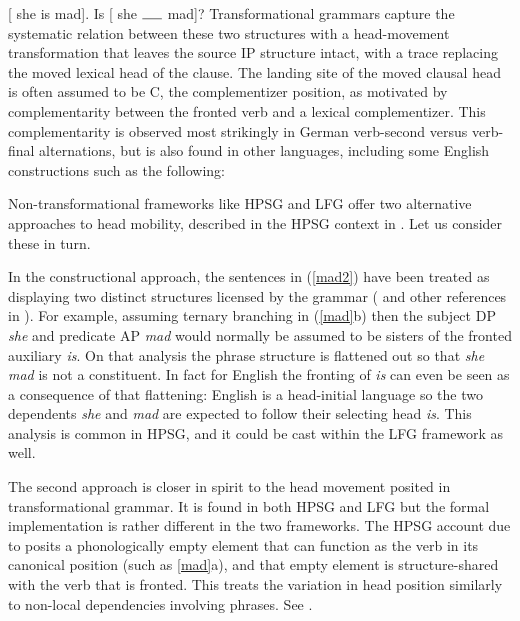 \eal 
\label{mad}
\ex {} [ she is mad].
\ex  Is   [ she $\rule{0.5cm}{0.15mm}$ mad]?
\zl
Transformational grammars capture the systematic relation between these two structures with a head-movement transformation that leaves the source IP structure intact, with a trace replacing the moved lexical head of the clause.  The landing site of the moved clausal head is often assumed to be C, the complementizer position, as motivated by complementarity between the fronted verb and a lexical complementizer.  This complementarity is observed most strikingly in German verb-second versus verb-final alternations, but is also found in other languages, including some English constructions such as the following:  

\eal 
\label{mad2}
      \zl Non-transformational frameworks like HPSG and LFG offer two alternative approaches to head mobility, described in the HPSG context in .  Let us consider these in turn.

In the constructional approach,  
 the sentences in (\ref{mad2}) have been treated as displaying two distinct structures licensed by the grammar (\citealt{Sag2020a} and other references in ).  For example, assuming ternary branching in (\ref{mad}b) then the subject DP \textit{she} and predicate AP \textit{mad} would normally be assumed to be sisters of the fronted auxiliary \textit{is}.  On that analysis the phrase structure is flattened out so that \textit{she mad} is not a constituent.  In fact for English the fronting of \textit{is} can even be seen as a consequence of that flattening:  English is a head-initial language so the two dependents \textit{she} and \textit{mad} are expected to follow their selecting head \textit{is}.  This analysis is common in HPSG, and it could be cast within the LFG framework as well.  

The second approach is closer in spirit to the head movement posited in transformational grammar.  It is found in both HPSG and LFG but the formal implementation is rather different in the two frameworks.  The HPSG  account due to \citet{Borsley89} posits a phonologically empty element that can function as the verb in its canonical position (such as \ref{mad}a), and that empty element is structure-shared with the verb that is fronted.  This treats the variation in head position similarly to non-local dependencies involving phrases.  See .

